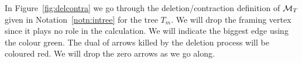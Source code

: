 \documentclass{amsart}
\theoremstyle{definition}
\begin{document}

In Figure~\ref{fig:delcontra} we go through the deletion/contraction definition of $\mathcal{M}_T$ given in Notation~\ref{notn:intree} for the tree $T_m$.
We will drop the framing vertex since it plays no role in the calculation.
We will indicate the biggest edge using the colour {\green green}.
The dual of arrows killed by the deletion process will be coloured {\red red}.
We will drop the zero arrows as we go along.
\end{document}
